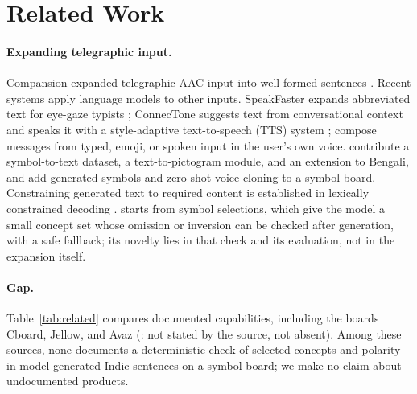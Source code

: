 \section{Related Work}
\label{sec:related}

\paragraph{Expanding telegraphic input.}
Compansion expanded telegraphic AAC input into well-formed sentences \citep{mccoy1998compansion}.
Recent systems apply language models to other inputs. SpeakFaster expands abbreviated text for eye-gaze typists \citep{cai2024speakfaster}; ConnecTone suggests text from conversational context and speaks it with a style-adaptive text-to-speech (TTS) system \citep{francis2024connectone}; \citet{mohan2024composition} compose messages from typed, emoji, or spoken input in the user's own voice.
\citet{karmakar-sinha-2024-aiding} contribute a symbol-to-text dataset, a text-to-pictogram module, and an extension to Bengali, and \citet{francis2025static} add generated symbols and zero-shot voice cloning to a symbol board.
Constraining generated text to required content is established in lexically constrained decoding \citep{hokamp-liu-2017-lexically,post-vilar-2018-fast}.
\sys{} starts from symbol selections, which give the model a small concept set whose omission or inversion can be checked after generation, with a safe fallback; its novelty lies in that check and its evaluation, not in the expansion itself.

\paragraph{Gap.}
Table~\ref{tab:related} compares documented capabilities, including the boards Cboard, Jellow, and Avaz (\nstated{}: not stated by the source, not absent).
Among these sources, none documents a deterministic check of selected concepts and polarity in model-generated Indic sentences on a symbol board; we make no claim about undocumented products.

